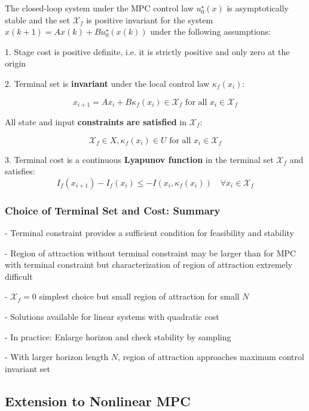 \begin{theorem}
	The closed-loop system under the MPC control law $u_0^\star(x)$
	is asymptotically stable and the set $\mathcal{X}_f$
	is positive invariant for the system
	$x(k+1) = Ax(k) + Bu_0^\star(x(k))$
	under the following assumptions:

	1. Stage cost is positive definite, i.e. it is strictly positive and only zero at
	the origin

	2. Terminal set is \textbf{invariant}
	under the local control law $\kappa_f(x_i)$:

	\[
		x_{i+1} = Ax_i + B\kappa_f(x_i) \in \mathcal{X}_f
		\text{ for all } x_i \in \mathcal{X}_f
	\]

	All state and input \textbf{constraints are satisfied} in $\mathcal{X}_f$:

	\[
		\mathcal{X}_f \in X, \kappa_f(x_i) \in U
		\text{ for all } x_i \in \mathcal{X}_f
	\]

	3. Terminal cost is a continuous \textbf{Lyapunov function}
	in the terminal set $\mathcal{X}_f$ and satisfies:
	\[
		I_f(x_{i+1}) - I_f(x_i) \leq
		- I(x_i, \kappa_f(x_i)) \quad
		\forall x_i \in \mathcal{X}_f
	\]
\end{theorem}


\subsubsection{Choice of Terminal Set and Cost: Summary}

- Terminal constraint provides a sufficient condition
for feasibility and stability

- Region of attraction without terminal constraint may be larger than for
MPC with terminal constraint but characterization of region of attraction
extremely difficult %

- $\mathcal{X}_f = 0$ simplest choice
but small region of attraction for small $N$

- Solutions available for linear systems with quadratic cost

- In practice: Enlarge horizon and check stability by sampling

- With larger horizon length $N$,
region of attraction approaches maximum control invariant set

\subsection{Extension to Nonlinear MPC}

